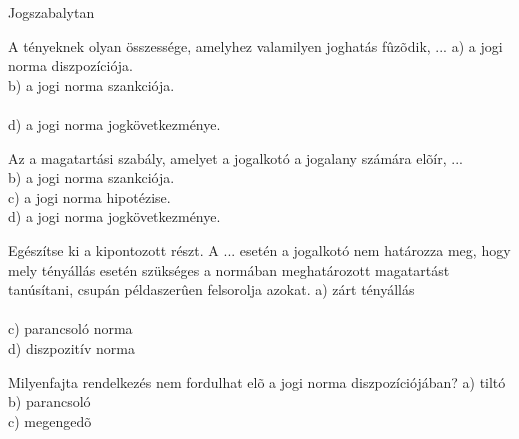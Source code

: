 \begin{frame}[plain]
\begin{tcolorbox}[center, colback={myyellow}, coltext={black}, colframe={myyellow}]
    { Jogszabalytan}\\
\end{tcolorbox}
\end{frame}

\begin{frame}  

\begin{tcolorbox}[title={18. Kérdés}]
A tényeknek olyan összessége, amelyhez valamilyen joghatás fûzõdik, ...
\tcblower
a) a jogi norma diszpozíciója.\\
b) a jogi norma szankciója.\\
\\
d) a jogi norma jogkövetkezménye.
\end{tcolorbox}

\begin{tcolorbox}[title={19. Kérdés}]
Az a magatartási szabály, amelyet a jogalkotó a jogalany számára elõír, ...
\tcblower
{}\\
b) a jogi norma szankciója.\\
c) a jogi norma hipotézise.\\
d) a jogi norma jogkövetkezménye.
\end{tcolorbox}

\begin{tcolorbox}[title={20. Kérdés}]
Egészítse ki a kipontozott részt.
A ... esetén a jogalkotó nem határozza meg, hogy mely tényállás esetén szükséges 
a normában meghatározott magatartást tanúsítani, csupán példaszerûen felsorolja azokat.
\tcblower
a) zárt tényállás\\
\\
c) parancsoló norma\\
d) diszpozitív norma
\end{tcolorbox}

\begin{tcolorbox}[title={21. Kérdés}]
Milyenfajta rendelkezés nem fordulhat elõ a jogi norma diszpozíciójában?
\tcblower
a) tiltó\\
b) parancsoló\\
c) megengedõ\\
\end{tcolorbox}

\end{frame}


